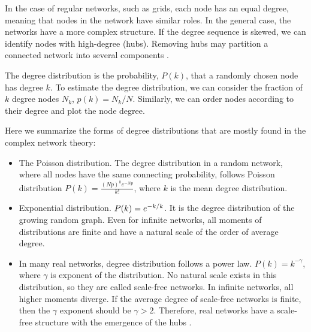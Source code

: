 In the case of regular networks, such as grids, each node has an equal degree, meaning that nodes in the network have similar roles. In the general case, the networks have a more complex structure. If the degree sequence is skewed, we can identify nodes with high-degree (hubs). Removing hubs may partition a connected network into several components \cite{albert2000error}. %
 
The degree distribution is the probability, $P(k)$, that a randomly chosen node has degree $k$. To estimate the degree distribution, we can consider the fraction of $k$ degree nodes $N_k$, $p(k) = N_k/N$. Similarly, we can order nodes according to their degree and plot the node degree.


Here we summarize the forms of degree distributions that are mostly found in the complex network theory:
\begin{itemize}
	\item The Poisson distribution. The degree distribution in a random network, where all nodes have the same connecting probability, follows Poisson distribution $P(k)= \frac{(Np)^ke^{-Np}}{k!}$, where $k$ is the mean degree distribution. 
	
	\item Exponential distribution. $P(k) = e^{-k/ \- k}$. It is the degree distribution of the growing random graph. Even for infinite networks, all moments of distributions are finite and have a natural scale of the order of average degree.
	
	\item In many real networks, degree distribution follows a power law. $P(k) = k ^ {-\gamma} $, where $\gamma$ is exponent of the distribution. No natural scale exists in this distribution, so they are called scale-free networks. In infinite networks, all higher moments diverge. If the average degree of scale-free networks is finite, then the $\gamma$ exponent should be $\gamma>2$. Therefore, real networks have a scale-free structure with the emergence of the hubs \cite{newman2010}. 
\end{itemize}


